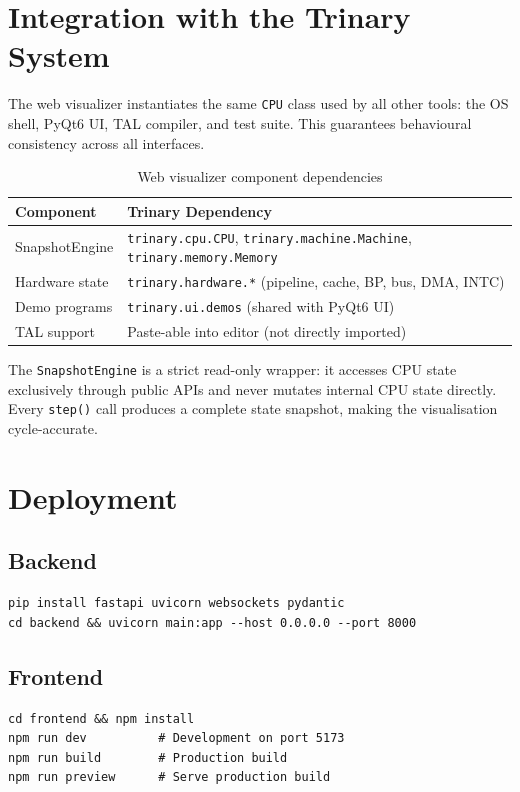 \documentclass[10pt,a4paper,twoside]{book}
\begin{document}
\section{Integration with the Trinary System}

The web visualizer instantiates the same \texttt{CPU} class used by all
other tools: the OS shell, PyQt6 UI, TAL compiler, and test suite. This
guarantees behavioural consistency across all interfaces.

\begin{table}[H]
\centering
\caption{Web visualizer component dependencies}
\label{tab:webdepts}
\begin{tabular}{ll}
\toprule
Component & Trinary Dependency \\
\midrule
SnapshotEngine & \texttt{trinary.cpu.CPU}, \texttt{trinary.machine.Machine}, \texttt{trinary.memory.Memory} \\
Hardware state & \texttt{trinary.hardware.*} (pipeline, cache, BP, bus, DMA, INTC) \\
Demo programs & \texttt{trinary.ui.demos} (shared with PyQt6 UI) \\
TAL support & Paste-able into editor (not directly imported) \\
\bottomrule
\end{tabular}
\end{table}

The \texttt{SnapshotEngine} is a strict read-only wrapper: it accesses
CPU state exclusively through public APIs and never mutates internal CPU
state directly. Every \texttt{step()} call produces a complete state
snapshot, making the visualisation cycle-accurate.

\section{Deployment}

\subsection{Backend}
\begin{verbatim}
pip install fastapi uvicorn websockets pydantic
cd backend && uvicorn main:app --host 0.0.0.0 --port 8000
\end{verbatim}

\subsection{Frontend}
\begin{verbatim}
cd frontend && npm install
npm run dev          # Development on port 5173
npm run build        # Production build
npm run preview      # Serve production build
\end{verbatim}
\end{document}
